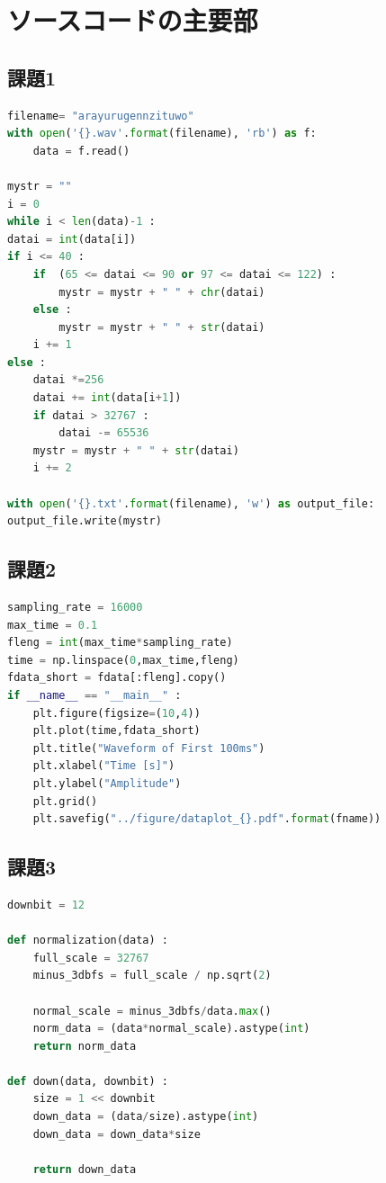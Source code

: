 \documentclass[a4j,11pt]{jarticle}
\begin{document}
    \section{ソースコードの主要部}
    \subsection{課題1}
    \begin{lstlisting}[language=Python, caption=binary.py]
filename= "arayurugennzituwo"
with open('{}.wav'.format(filename), 'rb') as f:
    data = f.read()

mystr = ""
i = 0
while i < len(data)-1 :
datai = int(data[i])
if i <= 40 :
    if  (65 <= datai <= 90 or 97 <= datai <= 122) :
        mystr = mystr + " " + chr(datai)
    else :
        mystr = mystr + " " + str(datai)
    i += 1
else :
    datai *=256
    datai += int(data[i+1])
    if datai > 32767 :
        datai -= 65536
    mystr = mystr + " " + str(datai)
    i += 2

with open('{}.txt'.format(filename), 'w') as output_file:
output_file.write(mystr)
    \end{lstlisting}
    \subsection{課題2}
    \begin{lstlisting}[language=Python, caption=dataplot.py]
sampling_rate = 16000
max_time = 0.1
fleng = int(max_time*sampling_rate)
time = np.linspace(0,max_time,fleng)
fdata_short = fdata[:fleng].copy()
if __name__ == "__main__" :
    plt.figure(figsize=(10,4))
    plt.plot(time,fdata_short)
    plt.title("Waveform of First 100ms")
    plt.xlabel("Time [s]")
    plt.ylabel("Amplitude")
    plt.grid()
    plt.savefig("../figure/dataplot_{}.pdf".format(fname))
    \end{lstlisting}
    \subsection{課題3}
    \begin{lstlisting}[language = Python, caption = bitdown.py]
downbit = 12

def normalization(data) :
    full_scale = 32767
    minus_3dbfs = full_scale / np.sqrt(2)

    normal_scale = minus_3dbfs/data.max()
    norm_data = (data*normal_scale).astype(int)
    return norm_data

def down(data, downbit) :
    size = 1 << downbit
    down_data = (data/size).astype(int)
    down_data = down_data*size

    return down_data
        
    \end{lstlisting}
\end{document}
